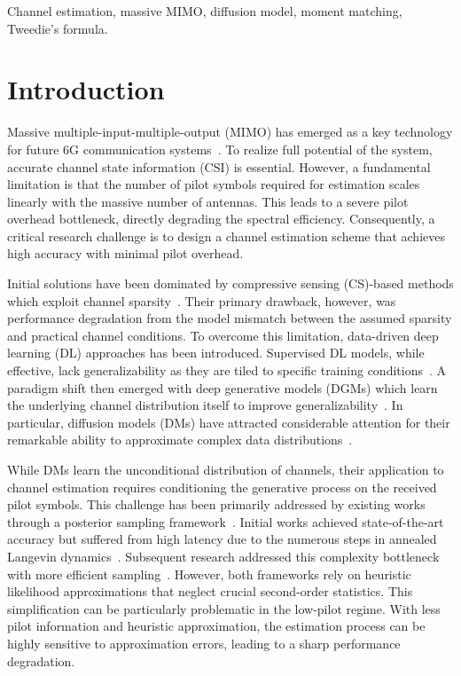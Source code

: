 \documentclass[lettersize,journal]{IEEEtran}
\begin{document}
\begin{IEEEkeywords}
Channel estimation, massive MIMO, diffusion model, moment matching, Tweedie's formula.
\end{IEEEkeywords}


\section{Introduction}

Massive multiple-input-multiple-output (MIMO) has emerged as a key technology for future 6G communication systems~\cite{busariMillimeterWaveMassiveMIMO2018}. To realize full potential of the system, accurate channel state information (CSI) is essential. However, a fundamental limitation is that the number of pilot symbols required for estimation scales linearly with the massive number of antennas. This leads to a severe pilot overhead bottleneck, directly degrading the spectral efficiency. Consequently, a critical research challenge is to design a channel estimation scheme that achieves high accuracy with minimal pilot overhead.

Initial solutions have been dominated by compressive sensing (CS)-based methods which exploit channel sparsity~\cite{zhangAtomicNormDenoisingBased2018,mendez-rialHybridMIMOArchitectures2016,choiCompressedSensingWireless2017}. Their primary drawback, however, was performance degradation from the model mismatch between the assumed sparsity and practical channel conditions. To overcome this limitation, data-driven deep learning (DL) approaches has been introduced. Supervised DL models, while effective, lack generalizability as they are tiled to specific training conditions~\cite{heDeepLearningBasedChannel2018}. A paradigm shift then emerged with deep generative models (DGMs) which learn the underlying channel distribution itself to improve generalizability~\cite{vanhuynhGenerativeAIPhysical2024}. In particular, diffusion models (DMs) have attracted considerable attention for their remarkable ability to approximate complex data distributions~\cite{hoDenoisingDiffusionProbabilistic2020}.

While DMs learn the unconditional distribution of channels, their application to channel estimation requires conditioning the generative process on the received pilot symbols. This challenge has been primarily addressed by existing works through a posterior sampling framework~\cite{arvinteMIMOChannelEstimation2023,zhouGenerativeDiffusionModels2025}. Initial works achieved state-of-the-art accuracy but suffered from high latency due to the numerous steps in annealed Langevin dynamics~\cite{arvinteMIMOChannelEstimation2023}. Subsequent research addressed this complexity bottleneck with more efficient sampling~\cite{zhouGenerativeDiffusionModels2025}. However, both frameworks rely on heuristic likelihood approximations that neglect crucial second-order statistics. This simplification can be particularly problematic in the low-pilot regime. With less pilot information and heuristic approximation, the estimation process can be highly sensitive to approximation errors, leading to a sharp performance degradation.
\end{document}
